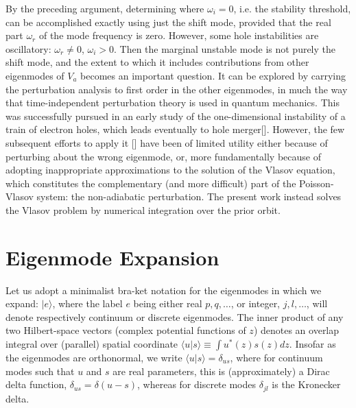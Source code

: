 \documentclass[12pt]{article}
\def\ket#1{|#1\rangle}
\def\bra#1{\langle#1}
\begin{document}
By the preceding argument, determining where $\omega_i=0$, i.e. the
stability threshold, can be accomplished exactly using just the shift
mode, provided that the real part $\omega_r$ of the mode frequency is
zero. However, some hole instabilities are oscillatory:
$\omega_r\not=0$, $\omega_i>0$. Then the marginal unstable mode is not
purely the shift mode, and the extent to which it includes
contributions from other eigenmodes of $V_a$ becomes an important
question. It can be explored by carrying the perturbation analysis to
first order in the other eigenmodes, in much the way that
time-independent perturbation theory is used in quantum
mechanics. This was successfully pursued in an early study of the
one-dimensional instability of a train of electron holes, which leads
eventually to hole merger[]. However, the few subsequent efforts to
apply it [] have been of limited utility either because of perturbing
about the wrong eigenmode, or, more fundamentally because of adopting
inappropriate approximations to the solution of the Vlasov equation,
which constitutes the complementary (and more difficult) part of the
Poisson-Vlasov system: the non-adiabatic perturbation. The present
work instead solves the Vlasov problem by numerical integration over
the prior orbit.


\section{Eigenmode Expansion}
Let us adopt a minimalist bra-ket notation for the eigenmodes in which
we expand: $\ket{e}$, where the label $e$ being either real
$p,q,\dots$, or integer, $j,l,\dots$, will denote respectively
continuum or discrete eigenmodes. The inner product of any two
Hilbert-space vectors (complex potential functions of $z$) denotes an
overlap integral over (parallel) spatial coordinate
$\bra{u}\ket{s}\equiv \int u^*(z)s(z)dz$. Insofar as the eigenmodes
are orthonormal, we write $\bra{u}\ket{s}=\delta_{us}$, where for
continuum modes such that $u$ and $s$ are real parameters, this is
(approximately) a Dirac delta function, $\delta_{us}=\delta(u-s)$,
whereas for discrete modes $\delta_{jl}$ is the Kronecker delta.
\end{document}
